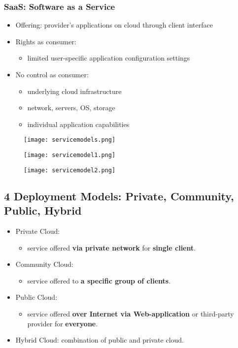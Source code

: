 \subsubsection{SaaS: Software as a Service}
\begin{itemize}
	\item Offering: provider's applications on cloud through client interface
	\item Rights as consumer:
	\begin{itemize}
		\item limited user-specific application configuration settings
	\end{itemize}
	\item No control as consumer:
	\begin{itemize}
		\item underlying cloud infrastructure
		\item network, servers, OS, storage
		\item individual application capabilities
	\end{itemize}
\end{itemize}
\begin{figure}[H]
	\centering
	\texttt{[image: servicemodels.png]}
\end{figure}
\begin{figure}[H]
	\centering
	\texttt{[image: servicemodel1.png]}
\end{figure}\begin{figure}[H]
\centering
\texttt{[image: servicemodel2.png]}
\end{figure}
\subsection{4 Deployment Models: Private, Community, Public, Hybrid}
\begin{itemize}
	\item Private Cloud:
	\begin{itemize}
		\item service offered \textbf{via private network} for \textbf{single client}.
	\end{itemize}
	\item Community Cloud:
	\begin{itemize}
		\item service offered to \textbf{a specific group of clients}.
	\end{itemize}
	\item Public Cloud:
	\begin{itemize}
		\item service offered \textbf{over Internet via Web-application} or third-party provider for \textbf{everyone}.
	\end{itemize}
	\item Hybrid Cloud: combination of public and private cloud.
\end{itemize}

